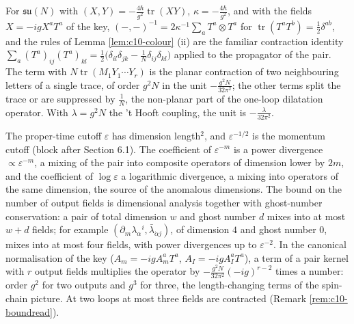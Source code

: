 \begin{remark}
For $\mathfrak{su}(N)$ with $(X,Y)=-\tfrac{4\hbar}{g^2}\operatorname{tr}(XY)$, $\kappa=-\tfrac{4\hbar}{g^2}$, and with the fields $X=-igX^aT^a$ of the key, $(-,-)^{-1}=2\kappa^{-1}\sum_aT^a\otimes T^a$ for $\operatorname{tr}(T^aT^b)=\tfrac12\delta^{ab}$, and the rules of Lemma \ref{lem:c10-colour} (ii) are the familiar contraction identity $\sum_a(T^a)_{ij}(T^a)_{kl}=\tfrac12\big(\delta_{il}\delta_{jk}-\tfrac1N\delta_{ij}\delta_{kl}\big)$ applied to the propagator of the pair. The term with $N\operatorname{tr}(M_1Y_1\cdots Y_r)$ is the planar contraction of two neighbouring letters of a single trace, of order $g^2N$ in the unit $-\frac{g^2N}{32\pi^2}$; the other terms split the trace or are suppressed by $\tfrac1N$, the non-planar part of the one-loop dilatation operator. With $\lambda=g^2N$ the 't Hooft coupling, the unit is $-\frac{\lambda}{32\pi^2}$.
\end{remark}

\begin{remark}
The proper-time cutoff $\varepsilon$ has dimension length$^2$, and $\varepsilon^{-1/2}$ is the momentum cutoff (block after Section 6.1). The coefficient of $\varepsilon^{-m}$ is a power divergence $\propto\varepsilon^{-m}$, a mixing of the pair into composite operators of dimension lower by $2m$, and the coefficient of $\log\varepsilon$ a logarithmic divergence, a mixing into operators of the same dimension, the source of the anomalous dimensions. The bound on the number of output fields is dimensional analysis together with ghost-number conservation: a pair of total dimension $w$ and ghost number $d$ mixes into at most $w+d$ fields; for example $(\partial_m\lambda_\alpha{}^i,\bar\lambda_{\dot\alpha j})$, of dimension $4$ and ghost number $0$, mixes into at most four fields, with power divergences up to $\varepsilon^{-2}$. In the canonical normalisation of the key ($A_m=-igA^a_mT^a$, $A_I=-igA^a_IT^a$), a term of a pair kernel with $r$ output fields multiplies the operator by $-\frac{g^2N}{32\pi^2}(-ig)^{r-2}$ times a number: order $g^2$ for two outputs and $g^3$ for three, the length-changing terms of the spin-chain picture. At two loops at most three fields are contracted (Remark \ref{rem:c10-boundread}).
\end{remark}


